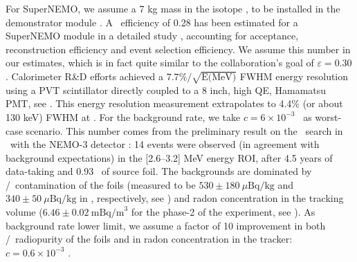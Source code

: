 For SuperNEMO, we assume a 7 kg mass in the isotope \SE, to be installed in the demonstrator module \cite{Shitov:2010nt}. A \bbonu\ efficiency of 0.28 has been estimated for a SuperNEMO module in a detailed study \cite{novella2009experimental}, accounting for acceptance, reconstruction efficiency and event selection efficiency. We assume this number in our estimates, which is in fact quite similar to the collaboration's goal of $\varepsilon =0.30$ \cite{Freshville:2011zz}. Calorimeter R\&D efforts achieved a $7.7\%/\sqrt{\textrm{E(MeV)}}$ FWHM energy resolution using a PVT scintillator directly coupled to a 8 inch, high QE, Hamamatsu PMT, see \cite{Freshville:2011zz}. This energy resolution measurement extrapolates to 4.4\% (or about 130 keV) FWHM at \Qbb. For the background rate, we take $c= 6\times 10^{-3}$ \ckkbby\ as worst-case scenario. This number comes from the preliminary result on the \bbonu\ search in \SE\ with the NEMO-3 detector \cite{simard2011results}: 14 events were observed (in agreement with background expectations) in the [2.6--3.2] MeV energy ROI, after 4.5 years of data-taking and 0.93 \kgbb\ of source foil. The backgrounds are dominated by \BI/\TL\ contamination of the foils (measured to be $530\pm 180\ \mu\mathrm{Bq/kg}$ and $340\pm 50\ \mu\mathrm{Bq/kg}$ in \SE, respectively, see \cite{NEMO:2009ewu}) and radon concentration in the tracking volume ($6.46\pm 0.02\ \mathrm{mBq/m}^3$ for the phase-2 of the experiment, see \cite{NEMO:2009ewu}). As background rate lower limit, we assume a factor of 10 improvement in both \TL/\BI\ radiopurity of the foils and in radon concentration in the tracker: $c=0.6\times 10^{-3}$ \ckkbby.
